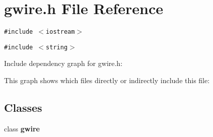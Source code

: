 \section{gwire.h File Reference}
\label{gwire_8h}
{\tt \#include $<$iostream$>$}\par
{\tt \#include $<$string$>$}\par


Include dependency graph for gwire.h:

This graph shows which files directly or indirectly include this file:\subsection*{Classes}
\begin{CompactItemize}
\item 
class \bf{gwire}
\end{CompactItemize}
